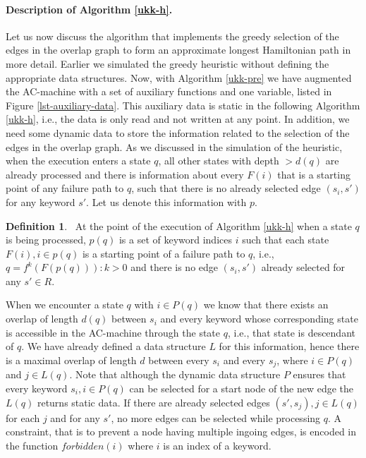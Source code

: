 \documentclass[english,twoside,censored,csm,algorithms-track-2020]{HYthesisML}
\theoremstyle{plain}
\theoremstyle{definition}
\newtheorem{definition}[theorem]{Definition}
\numberwithin{testexample}{chapter}
\begin{document}
\paragraph{Description of Algorithm \ref{ukk-h}.}
Let us now discuss the algorithm that implements the greedy selection of the edges in the
overlap graph to form an approximate longest Hamiltonian path in more detail. Earlier we simulated
the greedy heuristic without defining the appropriate data structures. Now, with Algorithm
\ref{ukk-pre} we have augmented the AC-machine with a set of auxiliary functions and one variable,
listed in Figure \ref{lst-auxiliary-data}.
This auxiliary data is static in the following Algorithm \ref{ukk-h}, i.e., the data is only read
and not written at any point. In addition, we need some dynamic data to store the information
related to the selection of the edges in the overlap graph. As we discussed in the simulation
of the heuristic, when the execution enters a state $q$, all other states with depth $>d(q)$ are
already processed and there is information about every $F(i)$ that is a starting point of any failure
path to $q$,
such that there is no already selected edge $(s_i, s')$ for any keyword $s'$. Let us denote
this information with $p$.

\begin{definition}~\label{def-p}
  At the point of the execution of Algorithm \ref{ukk-h} when a state $q$ is being processed,
  $p(q)$ is a set of keyword indices $i$ such that each state $ F(i), i\in p(q)$ is
  a starting point of a failure path to $q$, i.e., $q = f^k(F(p(q))) : k>0$ and there is no
  edge $(s_i, s')$ already selected for any $s'\in R$.
\end{definition}

When we encounter a state $q$ with $i\in P(q)$ we know that there exists an overlap of length
$d(q)$ between $s_i$ and every keyword whose corresponding state is accessible in the AC-machine
through the state $q$, i.e., that state is descendant of $q$. We have already defined a data structure
$L$ for this information, hence there is a maximal overlap of length $d$ between every $s_i$
and every $s_j$, where $i\in P(q)$ and $j\in L(q)$.
Note that although the dynamic data structure $P$ ensures that every keyword $s_i, i\in P(q)$ can be selected
for a start node of the new edge the $L(q)$ returns static data. If there are already selected
edges $(s',s_j), j\in L(q)$ for each $j$ and for any $s'$, no more edges can be selected while processing $q$.
A constraint, that is to prevent a node having multiple ingoing edges, is encoded in the
function $forbidden(i)$ where $i$ is an index of a keyword.
\end{document}
